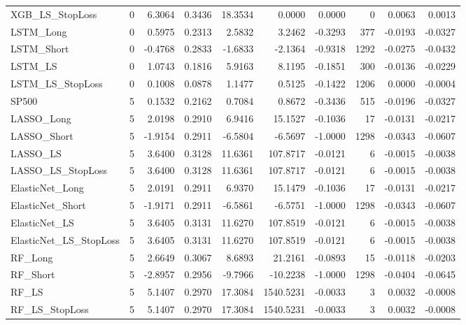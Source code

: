 \begin{tabular}{llrrrrrrrr}
\cline{1-10}
XGB\_LS\_StopLoss & 0 & 6.3064 & 0.3436 & 18.3534 & 0.0000 & 0.0000 & 0 & 0.0063 & 0.0013 \\
\cline{1-10}
LSTM\_Long & 0 & 0.5975 & 0.2313 & 2.5832 & 3.2462 & -0.3293 & 377 & -0.0193 & -0.0327 \\
\cline{1-10}
LSTM\_Short & 0 & -0.4768 & 0.2833 & -1.6833 & -2.1364 & -0.9318 & 1292 & -0.0275 & -0.0432 \\
\cline{1-10}
LSTM\_LS & 0 & 1.0743 & 0.1816 & 5.9163 & 8.1195 & -0.1851 & 300 & -0.0136 & -0.0229 \\
\cline{1-10}
LSTM\_LS\_StopLoss & 0 & 0.1008 & 0.0878 & 1.1477 & 0.5125 & -0.1422 & 1206 & 0.0000 & -0.0004 \\
\cline{1-10}
SP500 & 5 & 0.1532 & 0.2162 & 0.7084 & 0.8672 & -0.3436 & 515 & -0.0196 & -0.0327 \\
\cline{1-10}
LASSO\_Long & 5 & 2.0198 & 0.2910 & 6.9416 & 15.1527 & -0.1036 & 17 & -0.0131 & -0.0217 \\
\cline{1-10}
LASSO\_Short & 5 & -1.9154 & 0.2911 & -6.5804 & -6.5697 & -1.0000 & 1298 & -0.0343 & -0.0607 \\
\cline{1-10}
LASSO\_LS & 5 & 3.6400 & 0.3128 & 11.6361 & 107.8717 & -0.0121 & 6 & -0.0015 & -0.0038 \\
\cline{1-10}
LASSO\_LS\_StopLoss & 5 & 3.6400 & 0.3128 & 11.6361 & 107.8717 & -0.0121 & 6 & -0.0015 & -0.0038 \\
\cline{1-10}
ElasticNet\_Long & 5 & 2.0191 & 0.2911 & 6.9370 & 15.1479 & -0.1036 & 17 & -0.0131 & -0.0217 \\
\cline{1-10}
ElasticNet\_Short & 5 & -1.9171 & 0.2911 & -6.5861 & -6.5751 & -1.0000 & 1298 & -0.0343 & -0.0607 \\
\cline{1-10}
ElasticNet\_LS & 5 & 3.6405 & 0.3131 & 11.6270 & 107.8519 & -0.0121 & 6 & -0.0015 & -0.0038 \\
\cline{1-10}
ElasticNet\_LS\_StopLoss & 5 & 3.6405 & 0.3131 & 11.6270 & 107.8519 & -0.0121 & 6 & -0.0015 & -0.0038 \\
\cline{1-10}
RF\_Long & 5 & 2.6649 & 0.3067 & 8.6893 & 21.2161 & -0.0893 & 15 & -0.0118 & -0.0203 \\
\cline{1-10}
RF\_Short & 5 & -2.8957 & 0.2956 & -9.7966 & -10.2238 & -1.0000 & 1298 & -0.0404 & -0.0645 \\
\cline{1-10}
RF\_LS & 5 & 5.1407 & 0.2970 & 17.3084 & 1540.5231 & -0.0033 & 3 & 0.0032 & -0.0008 \\
\cline{1-10}
RF\_LS\_StopLoss & 5 & 5.1407 & 0.2970 & 17.3084 & 1540.5231 & -0.0033 & 3 & 0.0032 & -0.0008 \\

\end{tabular}
